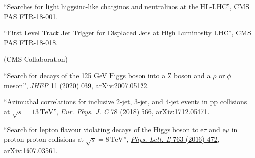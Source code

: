 \begin{description}[leftmargin=12pt,font=\normalfont\textit]
\begin{description}[leftmargin=12pt,font=\normalfont,labelsep=0em]
\item ``Searches for light higgsino-like charginos and neutralinos at the HL-LHC'', \href{https://cds.cern.ch/record/2648538}{CMS PAS FTR-18-001}.
\item ``First Level Track Jet Trigger for Displaced Jets at High Luminosity LHC'', \href{https://cds.cern.ch/record/2647987}{CMS PAS FTR-18-018}.
\end{description}
\ifdefined\longflag
\item[FNAL institutional review leader:] (CMS Collaboration)
\begin{description}[leftmargin=12pt,font=\normalfont,labelsep=0em]
\item ``Search for decays of the 125 GeV Higgs boson into a Z boson and a $\rho$ or $\phi$ meson'', \href{https://doi.org/10.1007/JHEP11(2020)039}{\emph{JHEP} 11 (2020) 039}, \href{https://arxiv.org/abs/2007.05122}{arXiv:2007.05122}.
\item ``Azimuthal correlations for inclusive 2-jet, 3-jet, and 4-jet events in pp collisions at $\sqrt{s} = 13\,\text{TeV}$'', \href{http://dx.doi.org/10.1140/epjc/s10052-018-6033-4}{\emph{Eur. Phys. J. C} 78 (2018) 566}, \href{http://arxiv.org/abs/1712.05471}{arXiv:1712.05471}.
\item ``Search for lepton flavour violating decays of the Higgs boson to e$\tau$ and e$\mu$ in proton-proton collisions at $\sqrt{s} = 8\,\text{TeV}$'', \href{http://dx.doi.org/10.1016/j.physletb.2016.09.062}{\emph{Phys. Lett. B} 763 (2016) 472}, \href{http://arxiv.org/abs/1607.03561}{arXiv:1607.03561}.
\end{description}
\fi
\end{description}